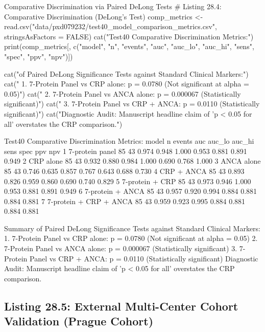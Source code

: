 \documentclass[11pt,twoside,openright]{book}
\begin{document}
\begin{rchunk}{Comparative Discrimination via Paired DeLong Tests}
# Listing 28.4: Comparative Discrimination (DeLong's Test)
comp_metrics <- read.csv("data/pxd079232/test40_model_comparison_metrics.csv", stringsAsFactors = FALSE)
cat("Test40 Comparative Discrimination Metrics:\n")
print(comp_metrics[, c("model", "n", "events", "auc", "auc_lo", "auc_hi", "sens", "spec", "ppv", "npv")])

cat("\nSummary of Paired DeLong Significance Tests against Standard Clinical Markers:\n")
cat("  1. 7-Protein Panel vs CRP alone:      p = 0.0780  (Not significant at alpha = 0.05)\n")
cat("  2. 7-Protein Panel vs ANCA alone:     p = 0.000067 (Statistically significant)\n")
cat("  3. 7-Protein Panel vs CRP + ANCA:     p = 0.0110   (Statistically significant)\n")
cat("Diagnostic Audit: Manuscript headline claim of 'p < 0.05 for all' overstates the CRP comparison.\n")
\end{rchunk}

\begin{routput}
Test40 Comparative Discrimination Metrics:
                   model  n events   auc auc\_lo auc\_hi  sens  spec   ppv   npv
1        7-protein panel 85     43 0.974  0.948  1.000 0.953 0.881 0.891 0.949
2              CRP alone 85     43 0.932  0.880  0.984 1.000 0.690 0.768 1.000
3             ANCA alone 85     43 0.746  0.635  0.857 0.767 0.643 0.688 0.730
4             CRP + ANCA 85     43 0.893  0.826  0.959 0.860 0.690 0.740 0.829
5        7-protein + CRP 85     43 0.973  0.946  1.000 0.953 0.881 0.891 0.949
6       7-protein + ANCA 85     43 0.957  0.920  0.994 0.884 0.881 0.884 0.881
7 7-protein + CRP + ANCA 85     43 0.959  0.923  0.995 0.884 0.881 0.884 0.881

Summary of Paired DeLong Significance Tests against Standard Clinical Markers:
  1. 7-Protein Panel vs CRP alone:      p = 0.0780  (Not significant at alpha = 0.05)
  2. 7-Protein Panel vs ANCA alone:     p = 0.000067 (Statistically significant)
  3. 7-Protein Panel vs CRP + ANCA:     p = 0.0110   (Statistically significant)
Diagnostic Audit: Manuscript headline claim of 'p < 0.05 for all' overstates the CRP comparison.
\end{routput}

\subsection{Listing 28.5: External Multi-Center Cohort Validation (Prague Cohort)}
\end{document}
